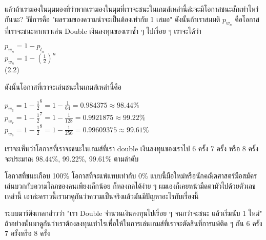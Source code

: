 \documentclass{article}
\begin{document}
แล้วถ้าเรามองในมุมมองที่ว่าหากเรามองในมุมที่เราจะชนะในเกมส์เหล่านี้ล่ะจะมีโอกาสชนะสักเท่าไหร่กันนะ? วิธีการคือ "ผลรวมของความน่าจะเป็นต้องเท่ากับ 1 เสมอ" ดังนั้นถ้าเราสมมติ $p_{w_n}$ คือโอกาสที่เราจะชนะหากเราเล่น Double เงินลงทุนของเราซ้ำ ๆ ไปเรื่อย ๆ เราจะได้ว่า
\begin{center}
$p_{w_n} = 1-p_{l_n}$ \\
$p_{w_n} = 1-(\frac{1}{2})^n$ \\
(2.2)
\end{center}
ดังนั้นโอกาสที่เราจะเล่นชนะในเกมส์เหล่านี้คือ 
\begin{center}
	$p_{w_6}=1-\frac{1}{2}^6=1-\frac{1}{64}=0.984375\approx98.44\%$\\
	$p_{w_7}=1-\frac{1}{2}^7=1-\frac{1}{128}=0.9921875\approx99.22\%$\\
	$p_{w_8}=1-\frac{1}{2}^8=1-\frac{1}{256}=0.99609375\approx99.61\%$\\
\end{center}
เราจะเห็นว่าโอกาสที่เราจะชนะในเกมส์ที่เรา double เงินลงทุนของเราไป 6 ครั้ง 7 ครั้ง หรือ 8 ครั้งจะประมาณ 98.44\%, 99.22\%, 99.61\% ตามลำดับ 

โอกาสที่ชนะเกือบ 100\% โอกาสที่จะแพ้แทบเท่ากับ 0\% แบบนี้มือใหม่หรือนักคณิตศาสตร์มือสมัครเล่นบวกกับความโลภของคนเพียงเล็กน้อย ก็หลงกลได้ง่าย ๆ ผมเองก็เคยหน้ามืดตามัวไปด้วยตัวเลขเหล่านี้ เอาล่ะคราวนี้เรามาดูกันว่าความเป็นจริงแล้วมันมีปัญหาอะไรกับเรื่องนี้

ระบบมาร์ติงเกลกล่าวว่า "เรา Double จำนวนเงินลงทุนไปเรื่อย ๆ จนกว่าจะชนะ แล้วเริ่มนับ 1 ใหม่" ถ้าอย่างนั้นมาดูกันว่าเราต้องลงทุนเท่าไรเพื่อให้ในการเล่นเกมส์ที่เราจะตัดสินที่การแพ้ติด ๆ กัน 6 ครั้ง 7 ครั้งหรือ 8 ครั้ง 
\end{document}
